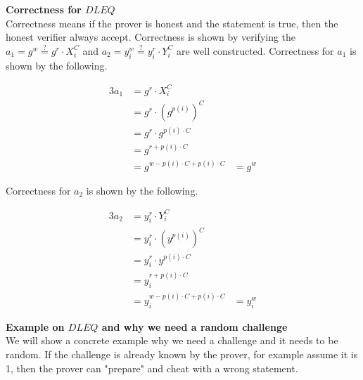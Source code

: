 \noindent
\textbf{Correctness for $DLEQ$}\\
Correctness means if the prover is honest and the statement is true, then the honest verifier always accept. Correctness is shown by verifying the $a_1=g^w \stackrel{?}{=} g^r \cdot X_i^C$ and $a_2=y_i^w \stackrel{?}{=} y_i^r \cdot Y_i^C$ are well constructed. Correctness for $a_1$ is shown by the following.



\begin{alignat*}{3}
a_1 &= g^r \cdot X_i^C \\
&= g^r \cdot (g^{p(i)})^C \\
&= g^r \cdot g^{p(i) \cdot C}\\
&=g^{r+p(i) \cdot C}      \\
&= g^{w - p(i) \cdot C + p(i) \cdot C} &= g^w
\end{alignat*}


\noindent
Correctness for $a_2$ is shown by the following.


\begin{alignat*}{3}
a_2 &= y_i^r \cdot Y_i^C\\
&= y_i^r \cdot (y^{p(i)})^C \\
&= y_i^r \cdot y^{p(i) \cdot C}\\
&=y_i^{r+p(i) \cdot C}      \\
&= y_i^{w - p(i) \cdot C + p(i) \cdot C} &= y_i^w
\end{alignat*}



\noindent
\textbf{Example on $DLEQ$ and why we need a random challenge}\\
We will show a concrete example why we need a challenge and it needs to be random. If the challenge is already known by the prover, for example  assume it is 1, then the prover can "prepare" and cheat with a wrong statement. 


